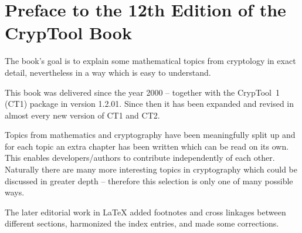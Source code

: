 %

\clearpage
\setcounter{secnumdepth}{-1}  %
\chapter{Preface to the 12th Edition of the CrypTool Book}
\setcounter{secnumdepth}{4}  %

The book's goal is to explain some mathematical topics from cryptology in
exact detail, nevertheless in a way which is easy to understand.

This book was delivered since the year 2000 -- together with the CrypTool~1
(CT1) package in version 1.2.01.
Since then it has been expanded and revised in almost every new version of CT1 and CT2.

Topics from mathematics and cryptography have been meaningfully split up and
for each topic an extra chapter has been written which can be read on its own.
This enables developers/authors to contribute independently of each other.
Naturally there are many more interesting topics in cryptography which could
be discussed in greater depth -- therefore this selection is only one of many
possible ways.

The later editorial work in LaTeX added footnotes and cross linkages between
different sections, harmonized the index entries, and made some corrections.

